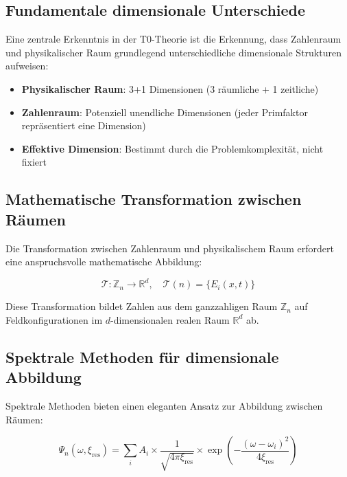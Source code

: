 \documentclass[12pt,a4paper]{article}
\newcommand{\xipar}{\ensuremath{\xi}}
\begin{document}
	\subsection{Fundamentale dimensionale Unterschiede}
	\label{subsec:dimensional_differences}
	
	Eine zentrale Erkenntnis in der T0-Theorie ist die Erkennung, dass Zahlenraum und physikalischer Raum grundlegend unterschiedliche dimensionale Strukturen aufweisen:
	
	\begin{tcolorbox}[colback=green!5!white,colframe=green!75!black,title=Kontrastierende dimensionale Strukturen]
		\begin{itemize}
			\item \textbf{Physikalischer Raum}: 3+1 Dimensionen (3 räumliche + 1 zeitliche)
			\item \textbf{Zahlenraum}: Potenziell unendliche Dimensionen (jeder Primfaktor repräsentiert eine Dimension)
			\item \textbf{Effektive Dimension}: Bestimmt durch die Problemkomplexität, nicht fixiert
		\end{itemize}
	\end{tcolorbox}
	
	\subsection{Mathematische Transformation zwischen Räumen}
	\label{subsec:mathematical_transformation}
	
	Die Transformation zwischen Zahlenraum und physikalischem Raum erfordert eine anspruchsvolle mathematische Abbildung:
	
	\begin{equation}
		\mathcal{T}: \mathbb{Z}_n \to \mathbb{R}^d, \quad \mathcal{T}(n) = \{E_i(x,t)\}
	\end{equation}
	
	Diese Transformation bildet Zahlen aus dem ganzzahligen Raum $\mathbb{Z}_n$ auf Feldkonfigurationen im $d$-dimensionalen realen Raum $\mathbb{R}^d$ ab.
	
	\subsection{Spektrale Methoden für dimensionale Abbildung}
	\label{subsec:spectral_methods}
	
	Spektrale Methoden bieten einen eleganten Ansatz zur Abbildung zwischen Räumen:
	
	\begin{equation}
		\Psi_n(\omega, \xipar_{\text{res}}) = \sum_i A_i \times \frac{1}{\sqrt{4\pi\xipar_{\text{res}}}} \times \exp\left(-\frac{(\omega-\omega_i)^2}{4\xipar_{\text{res}}}\right)
	\end{equation}
	
\end{document}
